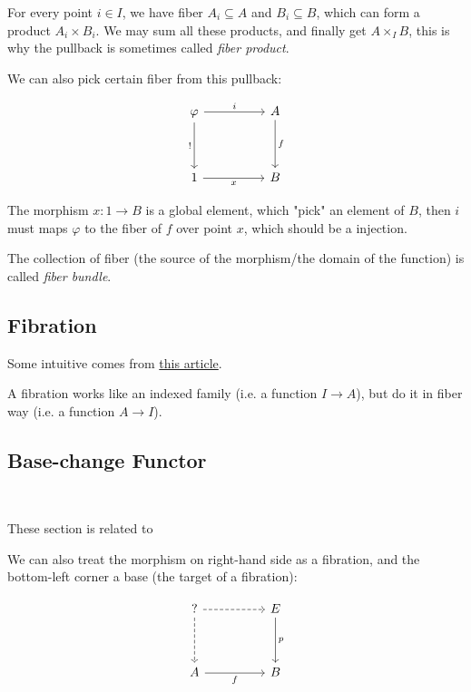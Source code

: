 \documentclass[./main.tex]{subfiles}
\begin{document}
For every point $i \in I$, we have fiber $A_i \subseteq A$ and $B_i \subseteq B$,
which can form a product $A_i \times B_i$. We may sum all these products, and finally
get $A \times_I B$, this is why the pullback is sometimes called \textit{fiber product}.

We can also pick certain fiber from this pullback:

\[\begin{tikzcd}
	\varphi && A \\
	\\
	1 && B
	\arrow["i", from=1-1, to=1-3]
	\arrow["{!}"', from=1-1, to=3-1]
	\arrow["f", from=1-3, to=3-3]
	\arrow["x"', from=3-1, to=3-3]
\end{tikzcd}\]

The morphism $x : 1 \rightarrow B$ is a global element, which "pick" an element
of $B$, then $i$ must maps $\varphi$ to the fiber of $f$ over point $x$,
which should be a injection.

The collection of fiber (the source of the morphism/the domain of the function) is called \textit{fiber bundle}.

\subsection{Fibration}

Some intuitive comes from
\href{https://guest0x0.xyz/family-and-fibration/family-and-fibration.pdf}{this article}.

\begin{intuitive}
  A fibration works like an indexed family (i.e. a function $I \rightarrow A$),
  but do it in fiber way (i.e. a function $A \rightarrow I$).
\end{intuitive}

\subsection{Base-change Functor}

~

These section is related to \daofp

We can also treat the morphism on right-hand side as a fibration, and the
bottom-left corner a base (the target of a fibration):

\[\begin{tikzcd}
	{?} && E \\
	\\
	A && B
	\arrow[dashed, from=1-1, to=1-3]
	\arrow[dashed, from=1-1, to=3-1]
	\arrow["p", from=1-3, to=3-3]
	\arrow["f"', from=3-1, to=3-3]
\end{tikzcd}\]
\end{document}
